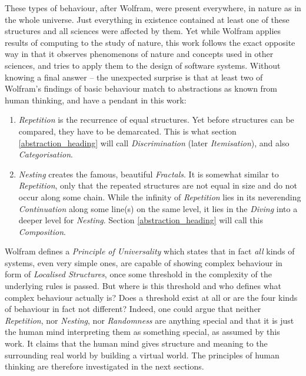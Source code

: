 These types of behaviour, after Wolfram, were present everywhere, in nature as
in the whole universe. Just everything in existence contained at least one of
these structures and all sciences were affected by them. Yet while Wolfram
applies results of computing to the study of nature, this work follows the exact
opposite way in that it observes phenomenons of nature and concepts used in
other sciences, and tries to apply them to the design of software systems.
Without knowing a final answer -- the unexpected surprise is that at least two
of Wolfram's findings of basic behaviour match to abstractions as known from
human thinking, and have a pendant in this work:

\newpage

\begin{enumerate}
    \item \emph{Repetition} is the recurrence of equal structures. Yet before
        structures can be compared, they have to be demarcated. This is what
        section \ref{abstraction_heading} will call \emph{Discrimination}
        (later \emph{Itemisation}), and also \emph{Categorisation}.
    \item \emph{Nesting} creates the famous, beautiful \emph{Fractals}. It is
        somewhat similar to \emph{Repetition}, only that the repeated
        structures are not equal in size and do not occur along some chain.
        While the infinity of \emph{Repetition} lies in its neverending
        \emph{Continuation} along some line(s) on the same level, it lies in
        the \emph{Diving} into a deeper level for \emph{Nesting}. Section
        \ref{abstraction_heading} will call this \emph{Composition}.
\end{enumerate}

Wolfram defines a \emph{Principle of Universality} which states that in fact
\emph{all} kinds of systems, even very simple ones, are capable of showing
complex behaviour in form of \emph{Localised Structures}, once some threshold
in the complexity of the underlying rules is passed. But where is this threshold
and who defines what complex behaviour actually is? Does a threshold exist at
all or are the four kinds of behaviour in fact not different? Indeed, one could
argue that neither \emph{Repetition}, nor \emph{Nesting}, nor \emph{Randomness}
are anything special and that it is just the human mind interpreting them as
something special, as assumed by this work. It claims that the human mind gives
structure and meaning to the surrounding real world by building a virtual world.
The principles of human thinking are therefore investigated in the next sections.

